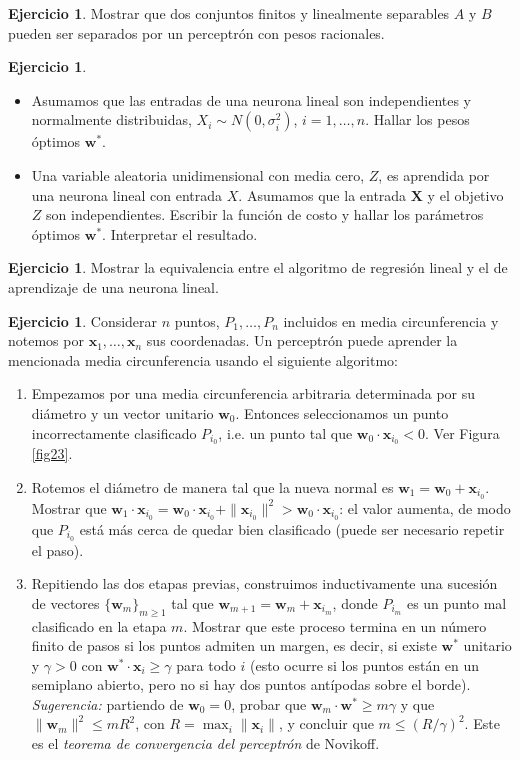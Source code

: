 \documentclass[12pt, a4paper]{amsbook}
\newcommand{\ww}{{\mathbf w}}
\newcommand{\xx}{{\mathbf x}}
\newcommand{\XX}{{\mathbf X}}
\theoremstyle{remark}
\theoremstyle{definition}
\newtheorem{ejer}[teo]{Ejercicio}
\numberwithin{section}{chapter}
\numberwithin{subsection}{section}
\numberwithin{equation}{section}
\numberwithin{figure}{chapter}
\begin{document}
\begin{ejer}
Mostrar que dos conjuntos finitos y linealmente separables $A$ y $B$ pueden ser separados por un perceptrón con pesos racionales.
\end{ejer}

\begin{ejer}
\begin{itemize}
\item[(a)] Asumamos que las entradas de una neurona lineal son independientes y normalmente distribuidas, $X_i\sim N(0,\sigma_i^2)$, $i=1,\dots,n$. Hallar los pesos óptimos $\ww^*$.

\item[(b)] Una variable aleatoria unidimensional con media cero, $Z$, es aprendida por una neurona lineal con entrada $X$. Asumamos que la entrada $\XX$ y el objetivo $Z$ son independientes. Escribir la función de costo y hallar los parámetros óptimos $\ww^*$. Interpretar el resultado.
\end{itemize}
\end{ejer}

\begin{ejer}
Mostrar la equivalencia entre el algoritmo de regresión lineal y el de aprendizaje de una neurona lineal.
\end{ejer}

\begin{ejer}\label{ej.perceptron}
Considerar $n$ puntos, $P_1,\dots, P_n$ incluidos en media circunferencia y notemos por $\xx_1,\dots,\xx_n$ sus coordenadas. Un perceptrón puede aprender la mencionada media circunferencia usando el siguiente algoritmo:
\begin{enumerate}
\item Empezamos por una media circunferencia arbitraria determinada por su diámetro y un vector unitario $\ww_0$. Entonces seleccionamos un punto incorrectamente clasificado $P_{i_0}$, i.e. un punto tal que $\ww_0\cdot\xx_{i_0}<0$. Ver Figura \ref{fig23}.

\item Rotemos el diámetro de manera tal que la nueva normal es $\ww_1 = \ww_0 + \xx_{i_0}$. Mostrar que $\ww_1\cdot\xx_{i_0}=\ww_0\cdot\xx_{i_0}+\|\xx_{i_0}\|^2>\ww_0\cdot\xx_{i_0}$: el valor aumenta, de modo que $P_{i_0}$ está más cerca de quedar bien clasificado (puede ser necesario repetir el paso).

\item Repitiendo las dos etapas previas, construimos inductivamente una sucesión de vectores $\{\ww_m\}_{m\ge 1}$ tal que $\ww_{m+1} = \ww_m + \xx_{i_m}$, donde $P_{i_m}$ es un punto mal clasificado en la etapa $m$. Mostrar que este proceso termina en un número finito de pasos si los puntos admiten un margen, es decir, si existe $\ww^*$ unitario y $\gamma>0$ con $\ww^*\cdot\xx_i\ge\gamma$ para todo $i$ (esto ocurre si los puntos están en un semiplano abierto, pero no si hay dos puntos antípodas sobre el borde). {\em Sugerencia:} partiendo de $\ww_0=0$, probar que $\ww_m\cdot\ww^*\ge m\gamma$ y que $\|\ww_m\|^2\le mR^2$, con $R=\max_i\|\xx_i\|$, y concluir que $m\le(R/\gamma)^2$. Este es el {\em teorema de convergencia del perceptrón} de Novikoff.
\end{enumerate}
\end{ejer}
\end{document}
